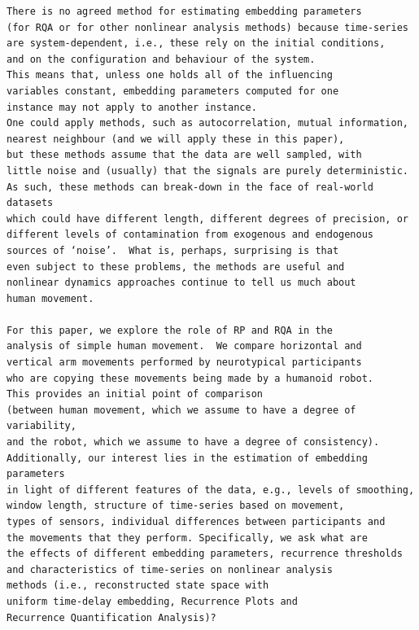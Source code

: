\documentclass[10pt]{article}
\begin{document}
\begin{verbatim}
There is no agreed method for estimating embedding parameters 
(for RQA or for other nonlinear analysis methods) because time-series 
are system-dependent, i.e., these rely on the initial conditions, 
and on the configuration and behaviour of the system.  
This means that, unless one holds all of the influencing 
variables constant, embedding parameters computed for one 
instance may not apply to another instance.   
One could apply methods, such as autocorrelation, mutual information, 
nearest neighbour (and we will apply these in this paper), 
but these methods assume that the data are well sampled, with 
little noise and (usually) that the signals are purely deterministic.  
As such, these methods can break-down in the face of real-world datasets 
which could have different length, different degrees of precision, or 
different levels of contamination from exogenous and endogenous 
sources of ‘noise’.  What is, perhaps, surprising is that 
even subject to these problems, the methods are useful and 
nonlinear dynamics approaches continue to tell us much about 
human movement.

For this paper, we explore the role of RP and RQA in the 
analysis of simple human movement.  We compare horizontal and 
vertical arm movements performed by neurotypical participants 
who are copying these movements being made by a humanoid robot.  
This provides an initial point of comparison 
(between human movement, which we assume to have a degree of variability, 
and the robot, which we assume to have a degree of consistency).   
Additionally, our interest lies in the estimation of embedding parameters 
in light of different features of the data, e.g., levels of smoothing, 
window length, structure of time-series based on movement, 
types of sensors, individual differences between participants and 
the movements that they perform. Specifically, we ask what are 
the effects of different embedding parameters, recurrence thresholds 
and characteristics of time-series on nonlinear analysis 
methods (i.e., reconstructed state space with 
uniform time-delay embedding, Recurrence Plots and 
Recurrence Quantification Analysis)?

\end{verbatim}
\end{document}
